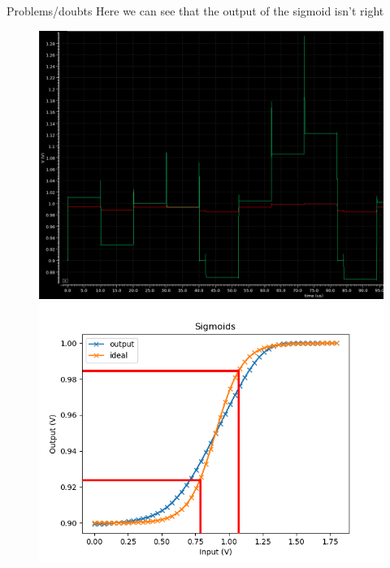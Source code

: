 \documentclass[table]{beamer}
\begin{document}
  \begin{frame}{Problems/doubts}
    Here we can see that the output of the sigmoid isn't right
    \begin{figure}[!tbp]
      \centering
      \begin{minipage}[b]{0.4\textwidth}
        \centering
        \includegraphics[width=\textwidth]{fulltrial1/sigmoid-prob.png}
      \end{minipage}
      \hspace{20pt}
      \begin{minipage}[b]{0.4\textwidth}
        \centering
        \includegraphics[width=\textwidth]{activation/sigmoid-prob}
      \end{minipage}
    \end{figure}
  \end{frame}
\end{document}

